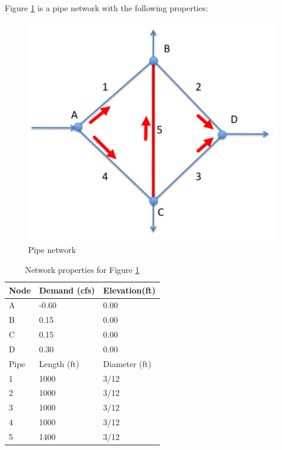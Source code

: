 \documentclass[11pt]{article}
\begin{document}
\begin{enumerate}
Figure \ref{fig:wheatstone_bridge} is a pipe network with the following properties:
\begin{figure}[h!] %
\centering
   \includegraphics[width=5.1in]{wheatstone_bridge.jpg}
   \caption{Pipe network}
   \label{fig:wheatstone_bridge} 
\end{figure}

\begin{table}[h!]
   \centering
   \caption{Network properties for Figure \ref{fig:wheatstone_bridge}}
\begin{tabular}{lll}
\hline
Node&Demand (cfs)&  Elevation(ft) \\
\hline
A & -0.60 & 0.00 \\
B &  0.15   & 0.00 \\
C & 0.15 & 0.00 \\
D & 0.30 & 0.00 \\
\hline
Pipe& Length (ft)&  Diameter (ft)\\
\hline
1 & 1000 & 3/12 \\
2 & 1000 & 3/12\\
3 & 1000 & 3/12\\
4 & 1000 & 3/12\\
5 & 1400 & 3/12\\
\end{tabular}
\label{tab:wheatstone1}
\normalsize
\end{table}
\clearpage


\end{enumerate}
\end{document}
